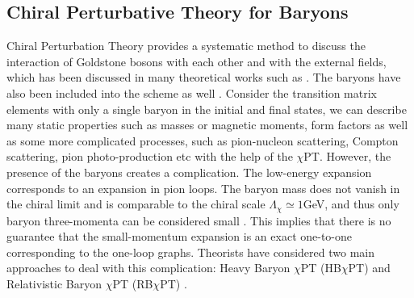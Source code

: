 \subsection{Chiral Perturbative Theory for Baryons}
\label{C3S1SS3}

Chiral Perturbation Theory provides a systematic method to discuss the interaction of Goldstone bosons with each other and with the external fields, which has been discussed in many theoretical works such as \cite{Gasser1984,Gasser1985}. The baryons have also been included into the scheme as well \cite{Bernard1992}. Consider the transition matrix elements with only a single baryon in the initial and final states, we can describe many static properties such as masses or magnetic moments, form factors as well as some more complicated processes, such as pion-nucleon scattering, Compton scattering, pion photo-production etc with the help of the $\chi$PT. However, the presence of the baryons creates a complication. The low-energy expansion corresponds to an expansion in pion loops. The baryon mass does not vanish in the chiral limit and is comparable to the chiral scale $\Lambda_\chi\simeq 1$GeV, and thus only baryon three-momenta can be considered small \cite{Bernard1993}. This implies that there is no guarantee that the small-momentum expansion is an exact one-to-one corresponding to the one-loop graphs. Theorists have considered two main approaches to deal with this complication: Heavy Baryon $\chi$PT (HB$\chi$PT) \cite{Jenkins1991a,Jenkins1991b} and Relativistic Baryon $\chi$PT (RB$\chi$PT) \cite{Ellis2003}.

